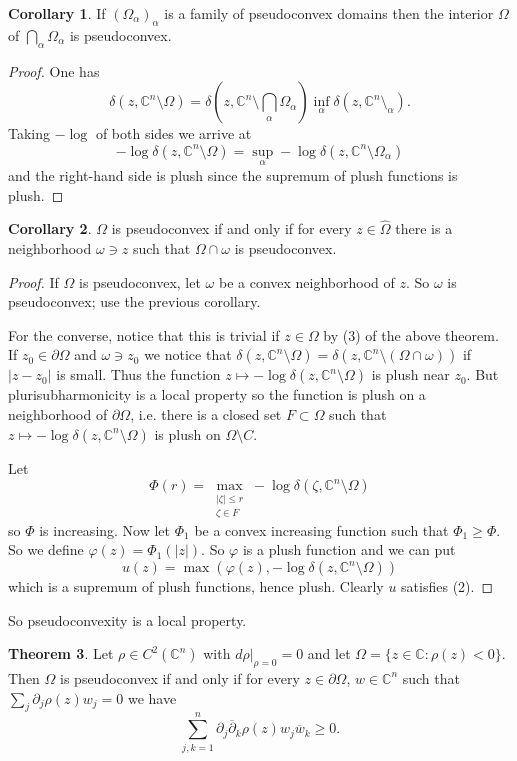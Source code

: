 \documentclass[12pt]{report}
\newcommand{\CC}{\mathbb{C}}
\newcommand{\dbar}{\overline \partial}
\theoremstyle{definition}
\newtheorem{theorem}{Theorem}[chapter]
\newtheorem{corollary}[theorem]{Corollary}
\begin{document}
\begin{corollary}
    If $(\Omega_\alpha)_\alpha$ is a family of pseudoconvex domains then the interior $\Omega$ of $\bigcap_\alpha \Omega_\alpha$ is pseudoconvex.
\end{corollary}
\begin{proof}
    One has
    $$\delta(z, \CC^n \setminus \Omega) = \delta\left(z, \CC^n \setminus \bigcap_\alpha \Omega_\alpha\right) \inf_\alpha \delta(z, \CC^n \setminus_\alpha).$$
    Taking $-\log$ of both sides we arrive at
    $$-\log \delta(z, \CC^n \setminus \Omega) = \sup_\alpha -\log \delta(z, \CC^n \setminus \Omega_\alpha)$$
    and the right-hand side is plush since the supremum of plush functions is plush.
\end{proof}
\begin{corollary}
    $\Omega$ is pseudoconvex if and only if for every $z \in \hat \Omega$ there is a neighborhood $\omega \ni z$ such that $\Omega \cap \omega$ is pseudoconvex.
\end{corollary}
\begin{proof}
    If $\Omega$ is pseudoconvex, let $\omega$ be a convex neighborhood of $z$. So $\omega$ is pseudoconvex; use the previous corollary.

    For the converse, notice that this is trivial if $z \in \Omega$ by (3) of the above theorem. If $z_0 \in \partial \Omega$ and $\omega \ni z_0$ we notice that $\delta(z, \CC^n \setminus \Omega) = \delta(z, \CC^n \setminus (\Omega \cap \omega))$ if $|z - z_0|$ is small. Thus the function $z \mapsto -\log \delta(z, \CC^n \setminus \Omega)$ is plush near $z_0$. But plurisubharmonicity is a local property so the function is plush on a neighborhood of $\partial \Omega$, i.e. there is a closed set $F \subset \Omega$ such that $z \mapsto -\log \delta(z, \CC^n \setminus \Omega)$ is plush on $\Omega \setminus C$. 

    Let
    $$\Phi(r) = \max_{\substack{|\zeta| \leq r\\\zeta \in F}} -\log \delta(\zeta, \CC^n \setminus \Omega)$$
    so $\Phi$ is increasing. Now let $\Phi_1$ be a convex increasing function such that $\Phi_1 \geq \Phi$. So we define $\varphi(z) = \Phi_1(|z|)$. So $\varphi$ is a plush function and we can put
    $$u(z) = \max(\varphi(z), -\log\delta(z, \CC^n\setminus\Omega))$$
    which is a supremum of plush functions, hence plush. Clearly $u$ satisfies (2). 
\end{proof}
    So pseudoconvexity is a local property.
\begin{theorem}
    \label{Levi condition}
    Let $\rho \in C^2(\CC^n)$ with $d\rho|_{\rho = 0} = 0$ and let $\Omega = \{z \in \CC: \rho(z) < 0\}$. Then $\Omega$ is pseudoconvex if and only if for every $z \in \partial \Omega$, $w \in \CC^n$ such that $\sum_j \partial_j \rho(z) w_j = 0$
    we have
    $$\sum_{j,k=1}^n \partial_j \dbar_k \rho(z) w_j \overline w_k \geq 0.$$
\end{theorem}
\end{document}
